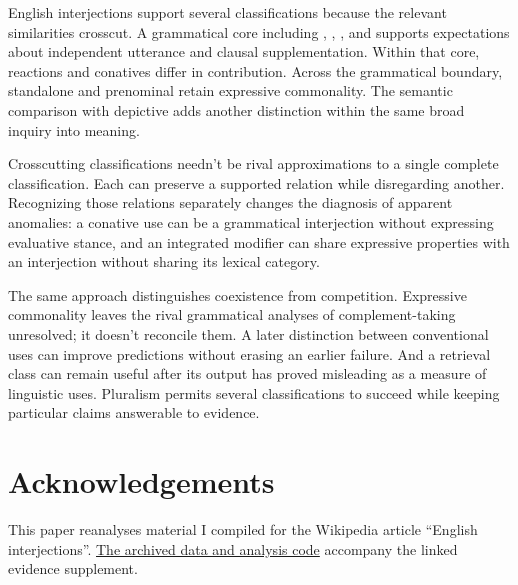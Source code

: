 \documentclass[12pt]{article}
\newif\ifblind
\begin{document}
English interjections support several classifications because the relevant
similarities crosscut. A grammatical core including ,
, , and  supports expectations about
independent utterance and clausal supplementation. Within that core,
reactions and conatives differ in contribution. Across the grammatical boundary,
standalone and prenominal  retain expressive commonality.
The semantic comparison with depictive  adds another
distinction within the same broad inquiry into meaning.

Crosscutting classifications needn't be rival approximations to a single
complete classification. Each can preserve a supported relation while
disregarding another. Recognizing those relations separately changes the
diagnosis of apparent anomalies: a conative use can be a grammatical
interjection without expressing evaluative stance, and an integrated modifier
can share expressive properties with an interjection without sharing
its lexical category.

The same approach distinguishes coexistence from competition. Expressive
commonality leaves the rival grammatical analyses of complement-taking
 unresolved; it doesn't reconcile them. A later distinction
between conventional uses can improve predictions without erasing an
earlier failure. And a retrieval class can remain useful after its
output has proved misleading as a measure of linguistic uses.
Pluralism permits several classifications to succeed while keeping particular
claims answerable to evidence.

\ifblind\else
\section*{Acknowledgements}

This paper reanalyses material I compiled for the Wikipedia article
\enquote{English interjections}.
\href{https://github.com/BrettRey/interjections-hpc/tree/master}{The archived
data and analysis code} accompany the linked evidence supplement.
\fi

\clearpage
\begingroup
\setlength{\emergencystretch}{3em}
\printbibliography
\endgroup
\end{document}
